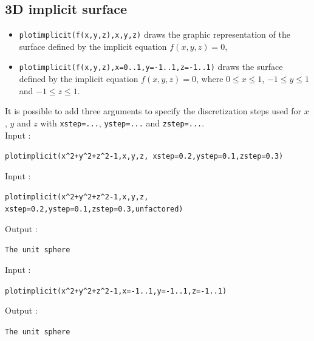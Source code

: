 \documentclass[a4paper,11pt]{book}
\begin{document}
\subsection{3D implicit surface}\label{sec:implicitplot3}
\begin{itemize}
\item {\tt plotimplicit(f(x,y,z),x,y,z)} draws the graphic 
representation of the surface defined by the implicit equation $f(x,y,z)=0$, 
\item {\tt plotimplicit(f(x,y,z),x=0..1,y=-1..1,z=-1..1)} draws the surface 
defined by the implicit equation $f(x,y,z)=0$, 
where $0\leq x \leq 1$, $-1\leq y \leq 1$ and $-1\leq z \leq 1$.
\end{itemize}
It is possible to add three arguments to specify the discretization
steps used for $x$, $y$ and $z$ with {\tt xstep=...}, {\tt ystep=...} and 
{\tt zstep=...}.\\
Input :
\begin{center}{\tt plotimplicit(x\verb|^|2+y\verb|^|2+z\verb|^|2-1,x,y,z, xstep=0.2,ystep=0.1,zstep=0.3)}\end{center}
Input :
\begin{center}{\tt plotimplicit(x\verb|^|2+y\verb|^|2+z\verb|^|2-1,x,y,z, xstep=0.2,ystep=0.1,zstep=0.3,unfactored)}\end{center}
Output :
\begin{center}{\tt The unit sphere}\end{center}
Input :
\begin{center}{\tt plotimplicit(x\verb|^|2+y\verb|^|2+z\verb|^|2-1,x=-1..1,y=-1..1,z=-1..1)}\end{center}
Output :
\begin{center}{\tt The unit sphere}\end{center}
\end{document}
